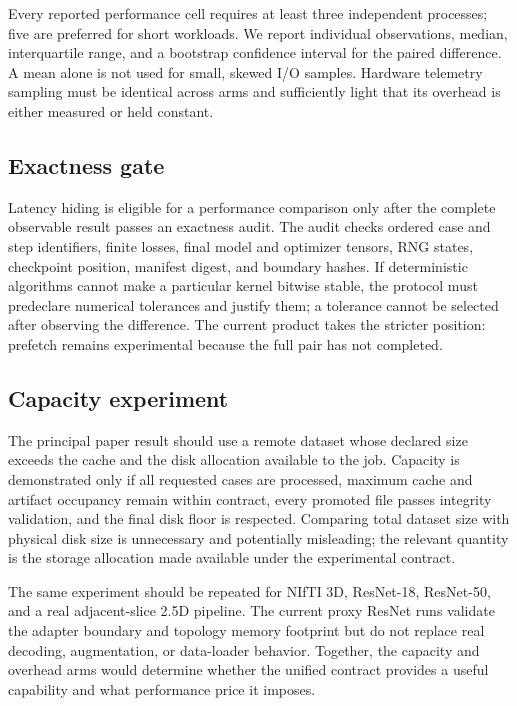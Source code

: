 Every reported performance cell requires at least three independent processes;
five are preferred for short workloads. We report individual observations,
median, interquartile range, and a bootstrap confidence interval for the paired
difference. A mean alone is not used for small, skewed I/O samples. Hardware
telemetry sampling must be identical across arms and sufficiently light that its
overhead is either measured or held constant.

\subsection{Exactness gate}

Latency hiding is eligible for a performance comparison only after the complete
observable result passes an exactness audit. The audit checks ordered case and
step identifiers, finite losses, final model and optimizer tensors, RNG states,
checkpoint position, manifest digest, and boundary hashes. If deterministic
algorithms cannot make a particular kernel bitwise stable, the protocol must
predeclare numerical tolerances and justify them; a tolerance cannot be selected
after observing the difference. The current product takes the stricter position:
prefetch remains experimental because the full pair has not completed.

\subsection{Capacity experiment}

The principal paper result should use a remote dataset whose declared size
exceeds the cache and the disk allocation available to the job. Capacity is
demonstrated only if all requested cases are processed, maximum cache and
artifact occupancy remain within contract, every promoted file passes integrity
validation, and the final disk floor is respected. Comparing total dataset size
with physical disk size is unnecessary and potentially misleading; the relevant
quantity is the storage allocation made available under the experimental
contract.

The same experiment should be repeated for NIfTI 3D, ResNet-18, ResNet-50, and
a real adjacent-slice 2.5D pipeline. The current proxy ResNet runs validate the
adapter boundary and topology memory footprint but do not replace real decoding,
augmentation, or data-loader behavior. Together, the capacity and overhead arms
would determine whether the unified contract provides a useful capability and
what performance price it imposes.
